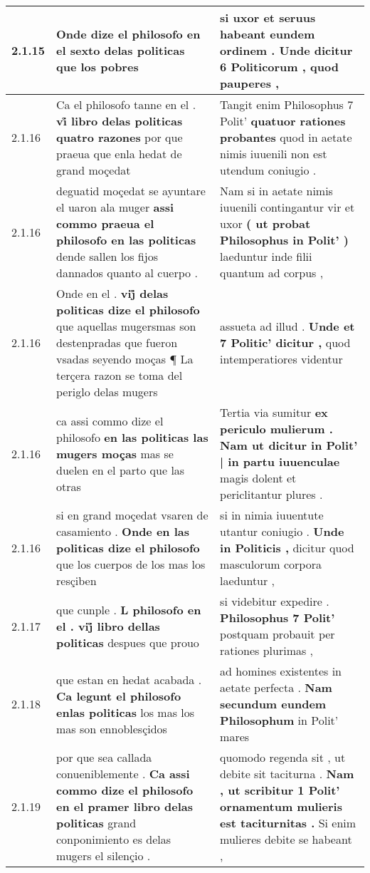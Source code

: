 \begin{tabular}{|p{1cm}|p{6.5cm}|p{6.5cm}|}
2.1.15 & Onde dize el philosofo \textbf{ en el sexto delas politicas } que los pobres & si uxor et seruus habeant eundem ordinem . \textbf{ Unde dicitur 6 Politicorum , } quod pauperes , \\\hline
2.1.16 & Ca el philosofo tanne en el . \textbf{ vi̊ libro delas politicas quatro razones } por que praeua que enla hedat de grand moçedat & Tangit enim Philosophus 7 Polit’ \textbf{ quatuor rationes probantes } quod in aetate nimis iuuenili non est utendum coniugio . \\\hline
2.1.16 & deguatid moçedat se ayuntare el uaron ala muger \textbf{ assi commo praeua el philosofo en las politicas } dende sallen los fijos dannados quanto al cuerpo . & Nam si in aetate nimis iuuenili contingantur vir et uxor \textbf{ ( ut probat Philosophus in Polit’ ) } laeduntur inde filii quantum ad corpus , \\\hline
2.1.16 & Onde en el . \textbf{ vij̊ delas politicas dize el philosofo } que aquellas mugersmas son destenpradas que fueron vsadas seyendo moças ¶ La terçera razon se toma del periglo delas mugers & assueta ad illud . \textbf{ Unde et 7 Politic’ dicitur , } quod intemperatiores videntur \\\hline
2.1.16 & ca assi commo dize el philosofo \textbf{ en las politicas las mugers moças } mas se duelen en el parto que las otras & Tertia via sumitur \textbf{ ex periculo mulierum . Nam ut dicitur in Polit’ | in partu iuuenculae } magis dolent et periclitantur plures . \\\hline
2.1.16 & si en grand moçedat vsaren de casamiento . \textbf{ Onde en las politicas dize el philosofo } que los cuerpos de los mas los resçiben & si in nimia iuuentute utantur coniugio . \textbf{ Unde in Politicis , } dicitur quod masculorum corpora laeduntur , \\\hline
2.1.17 & que cunple . \textbf{ L philosofo en el . vij̊ libro dellas politicas } despues que prouo & si videbitur expedire . \textbf{ Philosophus 7 Polit’ } postquam probauit per rationes plurimas , \\\hline
2.1.18 & que estan en hedat acabada . \textbf{ Ca legunt el philosofo enlas politicas } los mas los mas son ennoblesçidos & ad homines existentes in aetate perfecta . \textbf{ Nam secundum eundem Philosophum } in Polit’ mares \\\hline
2.1.19 & por que sea callada conueniblemente . \textbf{ Ca assi commo dize el philosofo en el pramer libro delas politicas } grand conponimiento es delas mugers el silençio . & quomodo regenda sit , ut debite sit taciturna . \textbf{ Nam , ut scribitur 1 Polit’ ornamentum mulieris est taciturnitas . } Si enim mulieres debite se habeant , \\\hline

\end{tabular}

